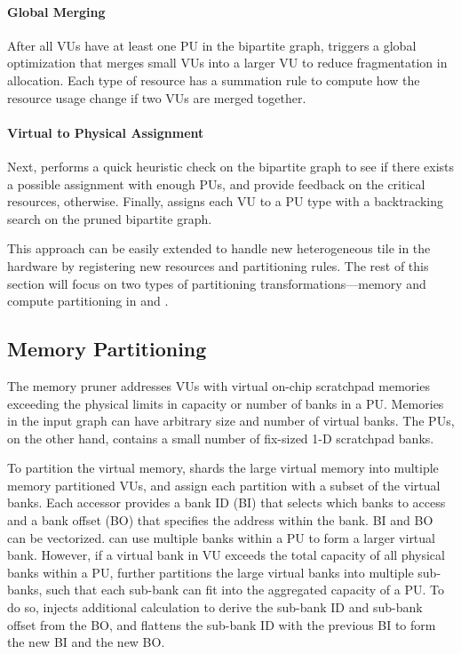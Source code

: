 \paragraph{Global Merging}
After all VUs have at least one PU in the bipartite graph, \name triggers a global optimization that merges 
small VUs into a larger VU to reduce fragmentation in allocation.
Each type of resource has a summation rule to compute how the resource usage change if two VUs are merged
together.

\paragraph{Virtual to Physical Assignment}
Next, \name performs a quick heuristic check on the bipartite graph to see if there exists a possible assignment with enough PUs, and provide feedback on the critical resources, otherwise.
Finally, \name assigns each VU to a PU type with a backtracking search on the pruned bipartite
graph.

This approach can be easily extended to handle new heterogeneous tile in the hardware by registering
new resources and partitioning rules.
The rest of this section will focus on two types of partitioning transformations---memory and
compute partitioning in  and . 

\subsection{Memory Partitioning} \label{sec:memsplit}
The memory pruner addresses VUs with virtual on-chip scratchpad memories exceeding the physical limits in capacity or number of banks in a PU.
Memories in the input graph can have arbitrary size and number of virtual banks.
The PUs, on the other hand, contains a small number of fix-sized 1-D scratchpad banks.

To partition the virtual memory, \name{} shards the large virtual memory into multiple memory partitioned VUs, and assign each partition with a subset of the virtual banks.
Each accessor provides a bank ID (BI) that selects which banks to access and a bank offset (BO) that specifies the address within the bank. 
BI and BO can be vectorized.
\name{} can use multiple banks within a PU to form a larger virtual bank.
However, if a virtual bank in VU exceeds the total capacity of all physical banks within a PU, \name{} further partitions the large virtual banks into multiple sub-banks, such that each sub-bank can fit into the aggregated capacity of a PU.
To do so, \name{} injects additional calculation to derive the sub-bank ID and sub-bank offset from the BO, and flattens the sub-bank ID with the previous BI to form the new BI and the new BO.

